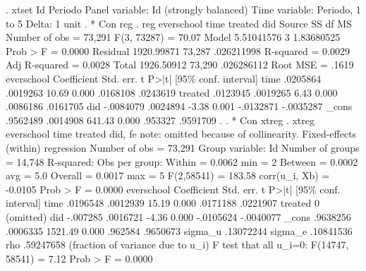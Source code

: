 . xtset Id Periodo
{\smallskip}
Panel variable: Id (strongly balanced)
 Time variable: Periodo, 1 to 5
         Delta: 1 unit
{\smallskip}
. * Con reg
. reg everschool time treated did
{\smallskip}
      Source {\VBAR}       SS           df       MS      Number of obs   =    73,291
   F(3, 73287)     =     70.07
       Model {\VBAR}  5.51041576         3  1.83680525   Prob > F        =    0.0000
    Residual {\VBAR}  1920.99871    73,287  .026211998   R-squared       =    0.0029
   Adj R-squared   =    0.0028
       Total {\VBAR}  1926.50912    73,290  .026286112   Root MSE        =     .1619
{\smallskip}
  everschool {\VBAR} Coefficient  Std. err.      t    P>|t|     [95\% conf. interval]
        time {\VBAR}   .0205864   .0019263    10.69   0.000     .0168108    .0243619
     treated {\VBAR}   .0123945   .0019265     6.43   0.000     .0086186    .0161705
         did {\VBAR}  -.0084079   .0024894    -3.38   0.001    -.0132871   -.0035287
       _cons {\VBAR}   .9562489   .0014908   641.43   0.000      .953327    .9591709
{\smallskip}
. 
. * Con xtreg
. xtreg everschool time treated did, fe 
note: {} omitted because of collinearity.
{\smallskip}
Fixed-effects (within) regression               Number of obs     =     73,291
Group variable: Id                              Number of groups  =     14,748
{\smallskip}
R-squared:                                      Obs per group:
     Within  = 0.0062                                         min =          2
     Between = 0.0002                                         avg =        5.0
     Overall = 0.0017                                         max =          5
{\smallskip}
                                                F(2,58541)        =     183.58
corr(u_i, Xb) = -0.0105                         Prob > F          =     0.0000
{\smallskip}
  everschool {\VBAR} Coefficient  Std. err.      t    P>|t|     [95\% conf. interval]
        time {\VBAR}   .0196548   .0012939    15.19   0.000     .0171188    .0221907
     treated {\VBAR}          0  (omitted)
         did {\VBAR}   -.007285   .0016721    -4.36   0.000    -.0105624   -.0040077
       _cons {\VBAR}   .9638256   .0006335  1521.49   0.000      .962584    .9650673
     sigma_u {\VBAR}  .13072244
     sigma_e {\VBAR}  .10841536
         rho {\VBAR}  .59247658   (fraction of variance due to u_i)
F test that all u_i=0: F(14747, 58541) = 7.12                Prob > F = 0.0000
